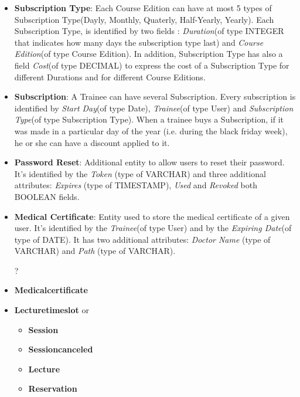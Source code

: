 \begin{itemize}
    	\item \textbf{Subscription Type}: Each Course Edition can have at most 5 types of Subscription Type(Dayly, Monthly, Quaterly, Half-Yearly, Yearly). Each Subscription Type, is identified by two fields : \textit{Duration}(of type INTEGER that indicates how many days the subscription type last) and \textit{Course Edition}(of type Course Edition). In addition, Subscription Type has also a field \textit{Cost}(of type DECIMAL) to express the cost of a Subscription Type for different Durations and for different Course Editions.
    	
    	\item \textbf{Subscription}: A Trainee can have several Subscription. Every subscription is identified by \textit{Start Day}(of type Date), \textit{Trainee}(of type User) and \textit{Subscription Type}(of type Subscription Type). When a trainee buys a Subscription, if it was made in a particular day of the year (i.e. during the black friday week), he or she can have a discount applied to it.
    	
    	\item \textbf{Password Reset}: Additional entity to allow users to reset their password. It's identified by the \textit{Token} (type of VARCHAR) and three additional attributes: \textit{Expires} (type of TIMESTAMP), \textit{Used} and \textit{Revoked} both BOOLEAN fields.
        
        \item \textbf{Medical Certificate}: Entity used to store the medical certificate of a given user. It's identified by the \textit{Trainee}(of type User) and by the \textit{Expiring Date}(of type of DATE). It has two additional attributes: \textit{Doctor Name} (type of VARCHAR) and \textit{Path} (type of VARCHAR).
        	
    	\color{red}
    	\item[?]
    	\item \textbf{Medical\textunderscore certificate}
    	
    	\item \textbf{Lecture\textunderscore time\textunderscore slot} or
		\begin{itemize}
    	    \item \textbf{Session}
		    \item \textbf{Session\textunderscore canceled}
		    \item \textbf{Lecture}
		    \item \textbf{Reservation}
    	\end{itemize}
		\color{black}
	
    \end{itemize}